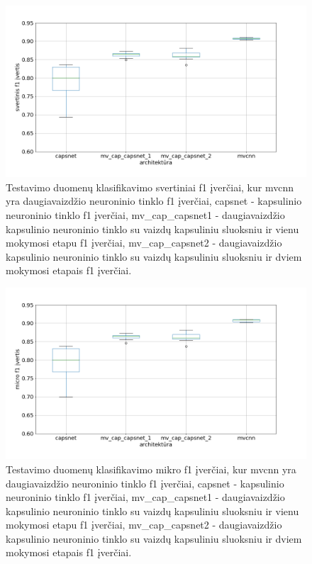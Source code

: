 \begin{figure}[H]
	\centering
	\includegraphics[scale=0.4]{img/boxplot_f1_weighted.png}
	\caption{
		Testavimo duomenų klasifikavimo svertiniai f1 įverčiai, kur mvcnn yra daugiavaizdžio neuroninio tinklo f1 įverčiai, capsnet - kapsulinio neuroninio tinklo f1 įverčiai, mv\_cap\_capsnet1 - daugiavaizdžio kapsulinio neuroninio tinklo su vaizdų kapsuliniu sluoksniu ir vienu mokymosi etapu f1 įverčiai, mv\_cap\_capsnet2 - daugiavaizdžio kapsulinio neuroninio tinklo su vaizdų kapsuliniu sluoksniu ir dviem mokymosi etapais f1 įverčiai.
	}
	\label{img:box_weighted_f1}
\end{figure}

\begin{figure}[H]
	\centering
	\includegraphics[scale=0.4]{img/boxplot_f1_micro.png}
	\caption{
		Testavimo duomenų klasifikavimo mikro f1 įverčiai, kur mvcnn yra daugiavaizdžio neuroninio tinklo f1 įverčiai, capsnet - kapsulinio neuroninio tinklo f1 įverčiai, mv\_cap\_capsnet1 - daugiavaizdžio kapsulinio neuroninio tinklo su vaizdų kapsuliniu sluoksniu ir vienu mokymosi etapu f1 įverčiai, mv\_cap\_capsnet2 - daugiavaizdžio kapsulinio neuroninio tinklo su vaizdų kapsuliniu sluoksniu ir dviem mokymosi etapais f1 įverčiai.
	}
	\label{img:box_micro_f1}
\end{figure}

